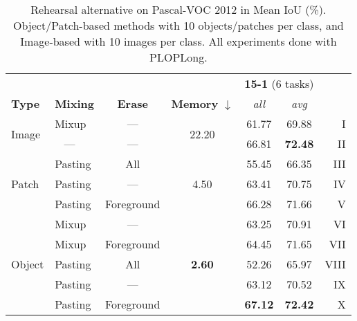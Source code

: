 \begin{table}[t]
    \centering
    \caption{Rehearsal alternative on Pascal-VOC 2012 in Mean IoU (\%). Object/Patch-based methods
        with 10 objects/patches per class, and Image-based with 10 images per class. All
        experiments done with PLOPLong.}
    \vspace*{-0.3cm}
    \label{tab:rehearsal_alternative}
    \begin{tabular}{@{}llc|c|cc|r@{}}
        \toprule
                                &                 &                &                                & \multicolumn{2}{c}{\textbf{15-1} (6 tasks)}                         \\
        \textbf{Type}           & \textbf{Mixing} & \textbf{Erase} & \textbf{Memory} $\downarrow$   & \textit{all}                                & \textit{avg}   &      \\
        \midrule
        \multirow{2}{*}{Image}  & Mixup           & ---            & \multirow{2}{*}{22.20}         & 61.77                                       & 69.88          & I    \\
                                & \,\,\,\,\,---   & ---            &                                & 66.81                                       & \textbf{72.48} & II   \\
        \hline
        \multirow{3}{*}{Patch}  & Pasting         & All            & \multirow{3}{*}{4.50}          & 55.45                                       & 66.35          & III  \\
                                & Pasting         & ---            &                                & 63.41                                       & 70.75          & IV   \\
                                & Pasting         & Foreground     &                                & 66.28                                       & 71.66          & V    \\
        \hline
        \multirow{5}{*}{Object} & Mixup           & ---            & \multirow{5}{*}{\textbf{2.60}} & 63.25                                       & 70.91          & VI   \\
                                & Mixup           & Foreground     &                                & 64.45                                       & 71.65          & VII  \\
                                & Pasting         & All            &                                & 52.26                                       & 65.97          & VIII \\
                                & Pasting         & ---            &                                & 63.12                                       & 70.52          & IX   \\
                                & Pasting         & Foreground     &                                & \textbf{67.12}                              & \textbf{72.42} & X    \\
        \bottomrule
    \end{tabular}
\end{table}
